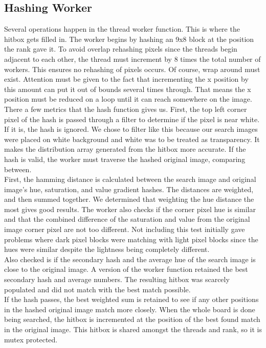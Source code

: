 \documentclass[10pt, journal]{vgtc}                %
\newcommand\tab[1][1cm]{\hspace*{#1}}
\begin{document}
\subsection{Hashing Worker}
\begin{flushleft}
\tab Several operations happen in the thread worker function. This is where the hitbox gets filled in. The worker begins by hashing an 9x8 block at the position the rank gave it. To avoid overlap rehashing pixels since the threads begin adjacent to each other, the thread must increment by 8 times the total number of workers. This ensures no rehashing of pixels occurs. Of course, wrap around must exist. Attention must be given to the fact that incrementing the x position by this amount can put it out of bounds several times through. That means the x position must be reduced on a loop until it can reach somewhere on the image.\\\smallskip
\tab There a few metrics that the hash function gives us. First, the top left corner pixel of the hash is passed through a filter to determine if the pixel is near white. If it is, the hash is ignored. We chose to filter like this because our search images were placed on white background and white was to be treated as transparency. It makes the distribution array generated from the hitbox more accurate. If the hash is valid, the worker must traverse the hashed original image, comparing between. \\\smallskip
\tab First, the hamming distance is calculated between the search image and original image's hue, saturation, and value gradient hashes. The distances are weighted, and then summed together. We determined that weighting the hue distance the most gives good results. The worker also checks if the corner pixel hue is similar and that the combined difference of the saturation and value from the original image corner pixel are not too different. Not including this test initially gave problems where dark pixel blocks were matching with light pixel blocks since the hues were similar despite the lightness being completely different.\\\smallskip
\tab Also checked is if the secondary hash and the average hue of the search image is close to the original image. A version of the worker function retained the best secondary hash and average numbers. The resulting hitbox was scarcely populated and did not match with the best match possible. \\\smallskip
\tab If the hash passes, the best weighted sum is retained to see if any other positions in the hashed original image match more closely. When the whole board is done being searched, the hitbox is incremented at the position of the best found match in the original image. This hitbox is shared amongst the threads and rank, so it is mutex protected. 
\end{flushleft}
\end{document}
